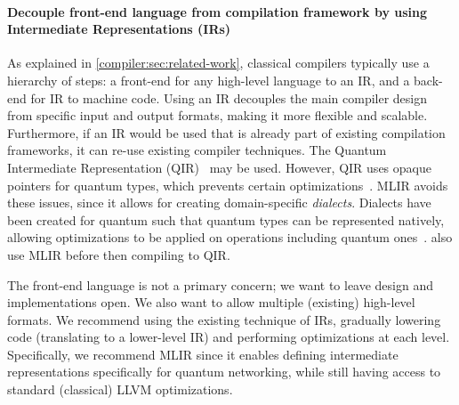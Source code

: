 \paragraph{Decouple front-end language from compilation framework by using Intermediate Representations (IRs)}

As explained in \cref{compiler:sec:related-work}, classical compilers typically use a hierarchy of steps: a front-end for any high-level language to an \acf{IR}, and a back-end for \ac{IR} to machine code.
Using an \ac{IR} decouples the main compiler design from specific input and output formats, making it more flexible and scalable.
Furthermore, if an \ac{IR} would be used that is already part of existing compilation frameworks, it can re-use existing compiler techniques.
The Quantum Intermediate Representation (QIR)~\cite{haner_software_2018, geller_introducing_2020} may be used.
However, QIR uses opaque pointers for quantum types, which prevents certain optimizations~\cite{ittah_enabling_2022, peduri_qssa_2022}.
\acf{MLIR} avoids these issues, since it allows for creating domain-specific \emph{dialects}.
Dialects have been created for quantum such that quantum types can be represented natively, allowing optimizations to be applied on operations including quantum ones~\cite{ittah_enabling_2022, peduri_qssa_2022}.
\cite{mccaskey_mlir_2021, nguyen_retargetable_2022} also use \ac{MLIR} before then compiling to QIR.

The front-end language is not a primary concern; we want to leave design and implementations open.
We also want to allow multiple (existing) high-level formats.
We recommend using the existing technique of IRs, gradually lowering code (translating to a lower-level IR) and performing optimizations at each level.
Specifically, we recommend \ac{MLIR} since it enables defining intermediate representations specifically for quantum networking, while still having access to standard (classical) LLVM optimizations.

